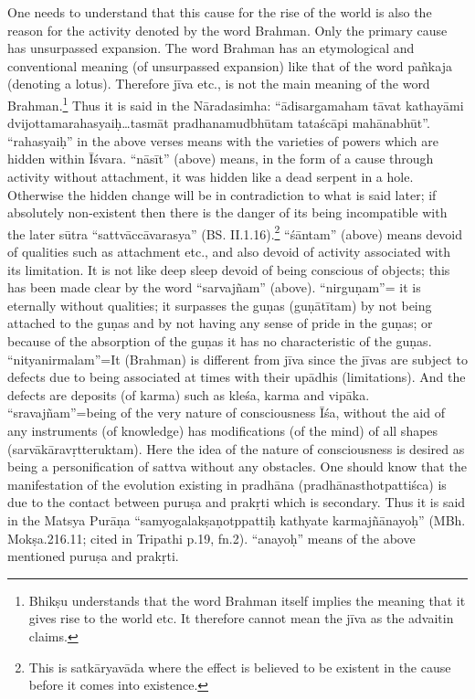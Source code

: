 One needs to understand that this cause for the rise of the world is also the reason for the activity denoted by the word Brahman. Only the primary cause has unsurpassed expansion. The word Brahman has an etymological and conventional meaning (of unsurpassed expansion) like that of the word pañkaja (denoting a lotus). Therefore jīva etc., is not the main meaning of the word Brahman.\footnote{Bhikṣu understands that the word Brahman itself implies the meaning that it gives rise to the world etc. It therefore cannot mean the jīva as the advaitin claims.} Thus it is said in the Nāradasimha: “ādisargamaham tāvat kathayāmi dvijottamarahasyaiḥ…tasmāt pradhanamudbhūtam tataścāpi mahānabhūt”. “rahasyaiḥ” in the above verses means with the varieties of powers which are hidden within Īśvara. “nāsīt” (above) means, in the form of a cause through activity without attachment, it was hidden like a dead serpent in a hole. Otherwise the hidden change will be in contradiction to what is said later; if absolutely non-existent then there is the danger of its being incompatible with the later sūtra “sattvāccāvarasya” (BS. II.1.16).\footnote{This is satkāryavāda where the effect is believed to be existent in the cause before it comes into existence.} “śāntam” (above) means devoid of qualities such as attachment etc., and also devoid of activity associated with its limitation. It is not like deep sleep devoid of being conscious of objects; this has been made clear by the word “sarvajñam” (above). “nirguṇam”= it is eternally without qualities; it surpasses the guṇas (guṇātītam) by not being attached to the guṇas and by not having any sense of pride in the guṇas; or because of the absorption of the guṇas it has no characteristic of the guṇas. “nityanirmalam”=It (Brahman) is different from jīva since the jīvas are subject to defects due to being associated at times with their upādhis (limitations). And the defects are deposits (of karma) such as kleśa, karma and vipāka. “sravajñam”=being of the very nature of consciousness Īśa, without the aid of any instruments (of knowledge) has modifications (of the mind) of all shapes (sarvākāravṛtteruktam). Here the idea of the nature of consciousness is desired as being a personification of sattva without any obstacles. One should know that the manifestation of the evolution existing in pradhāna (pradhānasthotpattiśca) is due to the contact between puruṣa and prakṛti which is secondary. Thus it is said in the Matsya Purāṇa “samyogalakṣaṇotppattiḥ kathyate karmajñānayoḥ” (MBh. Mokṣa.216.11; cited in Tripathi p.19, fn.2). “anayoḥ” means of the above mentioned puruṣa and prakṛti. 

